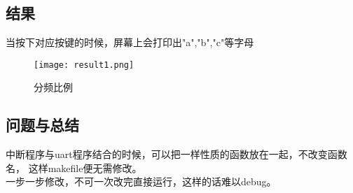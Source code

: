 \subsection{结果}
当按下对应按键的时候，屏幕上会打印出"a","b","c"等字母
\begin{figure}[htbp]
    \centering
    \texttt{[image: result1.png]}
    \caption{分频比例}
  \end{figure}
\subsection{问题与总结}
中断程序与uart程序结合的时候，可以把一样性质的函数放在一起，不改变函数名，
这样makefile便无需修改。\\
一步一步修改，不可一次改完直接运行，这样的话难以debug。